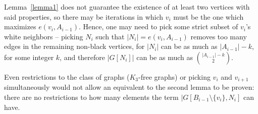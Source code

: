 \documentclass[12pt]{article}
\begin{document}
Lemma~\ref{lemma1} does not guarantee the existence of at least two vertices with said properties, so there may be iterations in which $v_i$ must be the one which maximizes $e(v_i, A_{i - 1})$.
Hence, one may need to pick some strict subset of $v_i$'s white neighbors -- picking $N_i$ such that $|N_i| = e(v_i, A_{i - 1})$ removes too many edges in the remaining non-black vertices, for $|N_i|$ can be as much as $|A_{i - 1}| - k$, for some integer $k$, and therefore $|G[N_i]|$ can be as much as ${|A_{i - 1}| - k}\choose{2}$.

Even restrictions to the class of graphs ($K_3$-free graphs) or picking $v_i$ and $v_{i + 1}$ simultaneously would not allow an equivalent to the second lemma to be proven: there are no restrictions to how many elements the term $|G[B_{i-1} \setminus \{v_i\}, N_i]$ can have.



\end{document}
